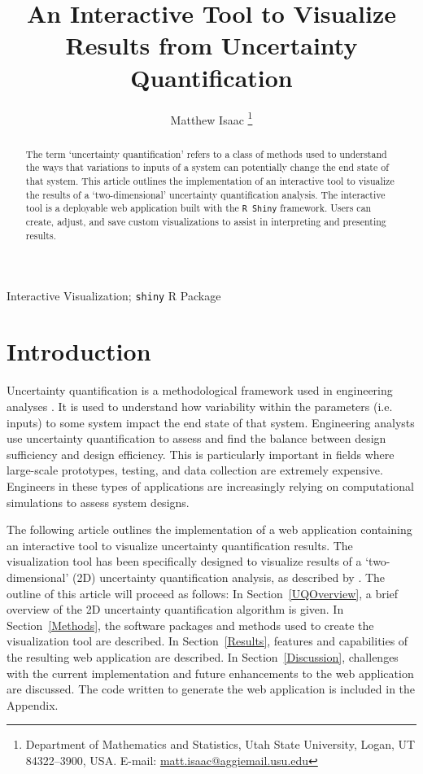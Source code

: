 \documentclass[11pt]{asaproc}\usepackage[]{graphicx}\usepackage[]{color}
\title{An Interactive Tool to Visualize Results from Uncertainty Quantification}
\author{Matthew Isaac \thanks{Department of Mathematics and Statistics, Utah State University, Logan, UT 84322--3900, USA. 
E-mail: \url{matt.isaac@aggiemail.usu.edu}}
}
\begin{document}
\renewcommand{\topfraction}{1.0}
\renewcommand{\bottomfraction}{1.0}
\renewcommand{\textfraction}{0.0}
\renewcommand{\floatpagefraction}{1.0}
\renewcommand{\dbltopfraction}{1.0}


\maketitle

\begin{abstract}
The term `uncertainty quantification' refers to a class of methods used to understand the ways that variations to inputs of a system can potentially change the end state of that system. This article outlines the implementation of an interactive tool to visualize the results of a `two-dimensional' uncertainty quantification analysis. The interactive tool is a deployable web application built with the {\tt R Shiny} framework. Users can create, adjust, and save custom visualizations to assist in interpreting and presenting results. 
\end{abstract}

\begin{keywords} Interactive Visualization; {\tt shiny} R Package
\end{keywords}


\section{Introduction}
\label{Introduction}

Uncertainty quantification is a methodological framework used in engineering analyses \citep{EW2018}. It is used to understand how variability  within the parameters (i.e. inputs) to some system impact the end state of that system. Engineering analysts use uncertainty quantification to assess and find the balance between design sufficiency and design efficiency. This is particularly important in fields where large-scale prototypes, testing, and data collection are extremely expensive. Engineers in these types of applications are increasingly relying on computational simulations to assess system designs.

The following article outlines the implementation of a web application containing an interactive tool to visualize uncertainty quantification results. The visualization tool has been specifically designed to visualize results of a `two-dimensional' (2D) uncertainty quantification analysis, as described by \cite{EW2018}. The outline of this article will proceed as follows: In Section~\ref{UQOverview}, a brief overview of the 2D uncertainty quantification algorithm is given. In Section~\ref{Methods}, the software packages and methods used to create the visualization tool are described. In Section~\ref{Results}, features and capabilities of the resulting web application are described. In Section~\ref{Discussion}, challenges with the current implementation and future enhancements to the web application are discussed. The code written to generate the web application is included in the Appendix.
\end{document}
